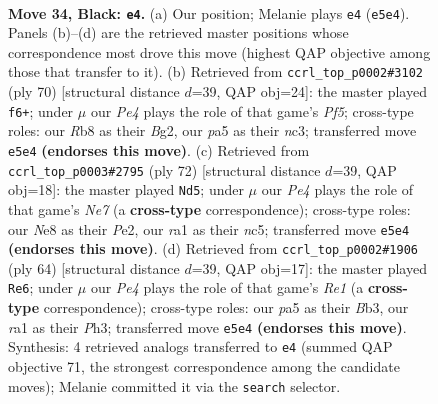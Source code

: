 \documentclass[11pt]{article}
\begin{document}
\clearpage

\begin{figure}[p]\centering
\begin{subfigure}{0.46\textwidth}\centering
\resizebox{\linewidth}{!}{%
\newchessgame
\chessboard[
  setfen={1r2n2k/2p2p1p/p1P5/P3pp2/6b1/6P1/5K2/RNB5 b - - 3 34},
  showmover=false,
  pgfstyle=straightmove, color=movearrow, markmove={e5-e4}
]}
\caption{}
\end{subfigure}\hfill
\begin{subfigure}{0.46\textwidth}\centering
\resizebox{\linewidth}{!}{%
\newchessgame
\chessboard[
  setfen={8/1p3pkp/1P6/2rp1P2/7R/2n1P2P/5PBK/8 w - - 3 36},
  showmover=false,
  pgfstyle=straightmove, color=movearrow, markmove={f5-f6}
]}
\caption{}
\end{subfigure}
\\[4pt]
\begin{subfigure}{0.46\textwidth}\centering
\resizebox{\linewidth}{!}{%
\newchessgame
\chessboard[
  setfen={4b3/1p2N1k1/3r1p2/p1n2B2/2P3P1/8/1R2PP2/6K1 w - - 1 37},
  showmover=false,
  pgfstyle=straightmove, color=movearrow, markmove={e7-d5}
]}
\caption{}
\end{subfigure}\hfill
\begin{subfigure}{0.46\textwidth}\centering
\resizebox{\linewidth}{!}{%
\newchessgame
\chessboard[
  setfen={1r3b1k/2R4p/1p3pp1/8/3r2P1/1B5P/PP3P2/4R1K1 w - - 0 33},
  showmover=false,
  pgfstyle=straightmove, color=movearrow, markmove={e1-e6}
]}
\caption{}
\end{subfigure}
\caption{\textbf{Move 34, Black: \texttt{e4}.} (a) Our position; Melanie plays \texttt{e4} (\texttt{e5e4}). Panels (b)--(d) are the retrieved master positions whose correspondence most drove this move (highest QAP objective among those that transfer to it). (b) Retrieved from \texttt{ccrl\_top\_p0002\#3102} (ply 70) [structural distance $d$=39, QAP obj=24]: the master played \texttt{f6+}; under $\mu$ our \emph{Pe4} plays the role of that game's \emph{Pf5}; cross-type roles: our \emph{R}b8 as their \emph{B}g2, our \emph{p}a5 as their \emph{n}c3; transferred move \texttt{e5e4} \textbf{(endorses this move)}. (c) Retrieved from \texttt{ccrl\_top\_p0003\#2795} (ply 72) [structural distance $d$=39, QAP obj=18]: the master played \texttt{Nd5}; under $\mu$ our \emph{Pe4} plays the role of that game's \emph{Ne7} (a \textbf{cross-type} correspondence); cross-type roles: our \emph{N}e8 as their \emph{P}e2, our \emph{r}a1 as their \emph{n}c5; transferred move \texttt{e5e4} \textbf{(endorses this move)}. (d) Retrieved from \texttt{ccrl\_top\_p0002\#1906} (ply 64) [structural distance $d$=39, QAP obj=17]: the master played \texttt{Re6}; under $\mu$ our \emph{Pe4} plays the role of that game's \emph{Re1} (a \textbf{cross-type} correspondence); cross-type roles: our \emph{p}a5 as their \emph{B}b3, our \emph{r}a1 as their \emph{P}h3; transferred move \texttt{e5e4} \textbf{(endorses this move)}. Synthesis: 4 retrieved analogs transferred to \texttt{e4} (summed QAP objective 71, the strongest correspondence among the candidate moves); Melanie committed it via the \texttt{search} selector.}
\label{fig:thought-m67}
\end{figure}
\end{document}
